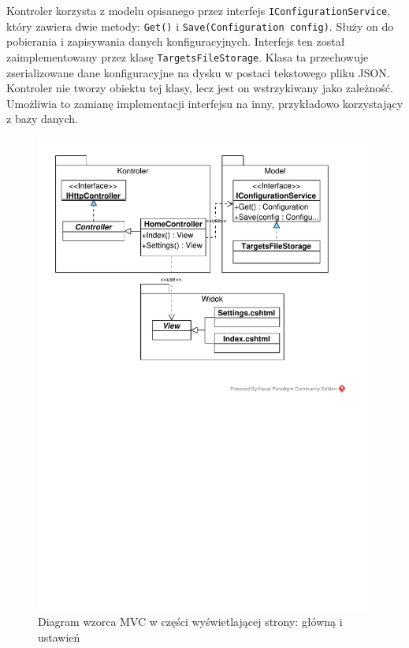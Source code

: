 Kontroler korzysta z modelu opisanego przez interfejs \texttt{IConfigurationService}, który zawiera dwie metody: \texttt{Get()} i \texttt{Save(Configuration config)}. Służy on do pobierania i zapisywania danych konfiguracyjnych. Interfejs ten został zaimplementowany przez klasę \texttt{TargetsFileStorage}. Klasa ta przechowuje zserializowane dane konfiguracyjne na dysku w postaci tekstowego pliku JSON. Kontroler nie tworzy obiektu tej klasy, lecz jest on wstrzykiwany jako zależność. Umożliwia to zamianę implementacji interfejsu na inny, przykładowo korzystający z bazy danych.

\begin{figure}[htbp]
	\centering
	\includegraphics[clip, trim=1cm 15cm 2.5cm 1cm, width=1.00\textwidth]{uml/mvc.pdf}
	\caption{Diagram wzorca MVC w części wyświetlającej strony: główną i ustawień}
	\label{fig:mvc}
\end{figure}

